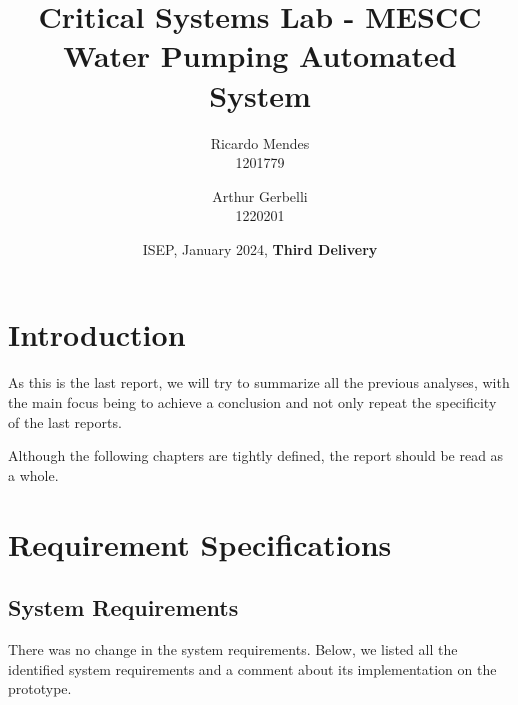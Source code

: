 \documentclass[11pt]{article}
\title{\textbf{Critical Systems Lab - MESCC\\ Water Pumping Automated System}}
\date{ISEP, January 2024, \textbf{Third Delivery}}
\author{Ricardo Mendes\\ 1201779
\and Arthur Gerbelli\\ 1220201}
\begin{document}
\maketitle              
\newpage
\tableofcontents
\newpage

%
\section{Introduction}

As this is the last report, we will try to summarize all the previous analyses, with the main focus being to achieve a conclusion and not only repeat the specificity of the last reports. 

Although the following chapters are tightly defined, the report should be read as a whole. 

\section{Requirement Specifications}

\subsection{System Requirements}

There was no change in the system requirements. Below, we listed all the identified system requirements and a comment about its implementation on the prototype. 
\end{document}
